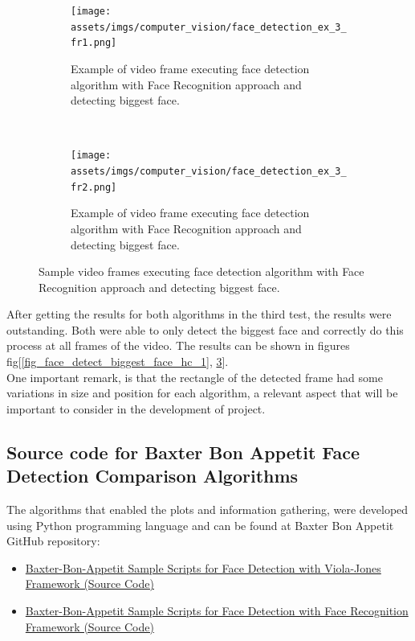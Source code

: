 \documentclass[11pt]{report} %
\begin{document}
\begin{figure}[H]
	\centering
	\begin{subfigure}{.5\textwidth}
		\centering
		\texttt{[image: assets/imgs/computer\_vision/face\_detection\_ex\_3\_fr1.png]}
		\caption{Example of video frame executing face detection algorithm with Face Recognition approach and detecting biggest face.}
		\label{fig_face_detect_biggest_face_fr_1_a}
	\end{subfigure}~
	\begin{subfigure}{.5\textwidth}
		\centering
		\texttt{[image: assets/imgs/computer\_vision/face\_detection\_ex\_3\_fr2.png]}
		\caption{Example of video frame executing face detection algorithm with Face Recognition approach and detecting biggest face.}
		\label{fig_face_detect_biggest_face_fr_1_b}
	\end{subfigure}%
	\caption{Sample video frames executing face detection algorithm with Face Recognition approach and detecting biggest face.}
	\label{fig_face_detect_biggest_face_fr_1}
\end{figure}


After getting the results for both algorithms in the third test, the results were outstanding. Both were able to only detect the biggest face and correctly do this process at all frames of the video. The results can be shown in figures fig[\ref{fig_face_detect_biggest_face_hc_1}, \ref{fig_face_detect_biggest_face_fr_1}].\\

One important remark, is that the rectangle of the detected frame had some variations in size and position for each algorithm, a relevant aspect that will be important to consider in the development of  project.\\


\subsection{Source code for Baxter Bon Appetit Face Detection Comparison Algorithms}

The algorithms that enabled the plots and information gathering, were developed using Python programming language and can be found at Baxter Bon Appetit GitHub repository:

\begin{itemize}
    \color{blue}
    \item \href{https://github.com/san99tiago/baxter-bon-appetit/blob/main/python/computer_vision/face_detect_haar_cascade/samples}{Baxter-Bon-Appetit Sample Scripts for Face Detection with Viola-Jones Framework (Source Code)}
    \color{blue}
    \item \href{https://github.com/san99tiago/baxter-bon-appetit/blob/main/python/computer_vision/face_detect_face_recognition/samples}{Baxter-Bon-Appetit Sample Scripts for Face Detection with Face Recognition Framework (Source Code)}
\end{itemize}
\end{document}
